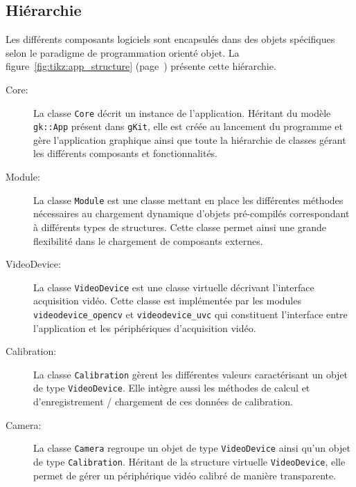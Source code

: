 \documentclass[10pt,a4paper,twoside, twocolumn]{report}
\newcommand*{\rootPath}{../}
\begin{document}
\subsection{Hiérarchie}

Les différents composants logiciels sont encapsulés dans des objets spécifiques selon le paradigme de programmation orienté objet. La figure~\ref{fig:tikz:app_structure} (page~\pageref{fig:tikz:app_structure}) présente cette hiérarchie.
\begin{figure*}[ht!]
	\centering
	
	\caption{Structure de l’application}
	\label{fig:tikz:app_structure}
\end{figure*}

\begin{description}
	\item[Core:] La classe \texttt{Core} décrit un instance de l’application. Héritant du modèle \texttt{gk::App} présent dans \texttt{gKit}, elle est créée au lancement du programme et gère l’application graphique ainsi que toute la hiérarchie de classes gérant les différents composants et fonctionnalités.

	\item[Module:] La classe \texttt{Module} est une classe mettant en place les différentes méthodes nécessaires au chargement dynamique d’objets pré-compilés correspondant à différents types de structures. Cette classe permet ainsi une grande flexibilité dans le chargement de composants externes.

	\item[VideoDevice:] La classe \texttt{VideoDevice} est une classe virtuelle décrivant l’interface acquisition vidéo. Cette classe est implémentée par les modules \texttt{videodevice\_opencv} et \texttt{videodevice\_uvc} qui constituent l’interface entre l’application et les périphériques d’acquisition vidéo.
	\item[Calibration:] La classe \texttt{Calibration} gèrent les différentes valeurs caractérisant un objet de type \texttt{VideoDevice}. Elle intègre aussi les méthodes de calcul et d’enregistrement / chargement de ces données de calibration.
	\item[Camera:] La classe \texttt{Camera} regroupe un objet de type \texttt{VideoDevice} ainsi qu’un objet de type \texttt{Calibration}. Héritant de la structure virtuelle \texttt{VideoDevice}, elle permet de gérer un périphérique vidéo calibré de manière transparente.


\end{description}
\end{document}
